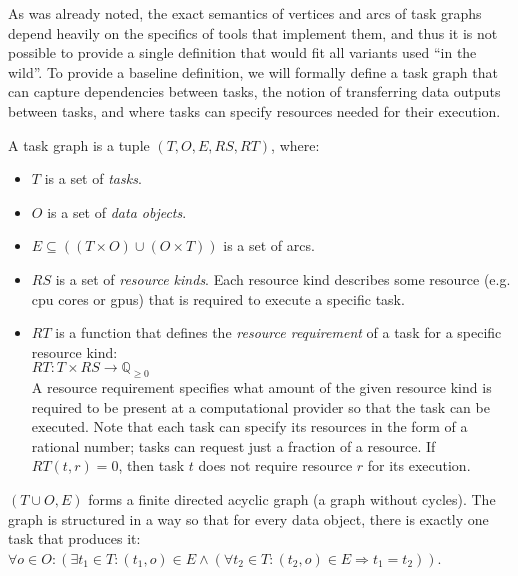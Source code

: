 As was already noted, the exact semantics of vertices and arcs of task graphs depend heavily on the
specifics of tools that implement them, and thus it is not possible to provide a single definition
that would fit all variants used ``in the wild''. To provide a baseline definition, we will
formally define a task graph that can capture dependencies between tasks, the notion of
transferring data outputs between tasks, and where tasks can specify resources needed for their
execution.

\newcommand{\alltaskpairs}{\forall t_1\in{}T, \forall t_2\in{}T}

A task graph is a tuple $(T, O, E, RS, RT)$, where:
\begin{itemize}[itemsep=0pt]
	\item $T$ is a set of \emph{tasks}.
	\item $O$ is a set of \emph{data objects}.
	\item $E \subseteq ((T\times{}O) \cup (O\times{}T))$ is a set of arcs.
	\item $RS$ is a set of \emph{resource kinds}. Each resource kind describes some resource
	      (e.g. \gls{cpu} cores or \glspl{gpu})
	      that is required to execute a specific task.
	\item $RT$ is a function that defines the \emph{resource requirement} of a task for
	      a specific resource kind: \\ $RT\colon T \times RS \rightarrow \mathbb{Q}_{\geq{}0}$ \\ A resource requirement specifies what amount
	      of the given resource kind is required to be present at a computational provider so that the task
	      can be executed. Note that each task can specify its resources in the form of a rational number;
	      tasks can request just a fraction of a resource. If $RT(t, r) = 0$, then task
	      $t$ does not require resource $r$ for its execution.
\end{itemize}

$(T \cup O, E)$ forms a finite directed acyclic graph (a graph without cycles). The graph is
structured in a way so that for every data
object, there is exactly one task that produces it: \\ $\forall o\in{}O: (\exists t_1\in{}T: (t_1, o) \in E \land
	(\forall t_2\in{}T: (t_2, o) \in E \Rightarrow t_1 = t_2))$.

